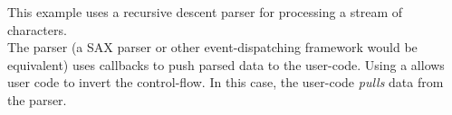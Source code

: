 \label{appendix}
This example uses a recursive descent parser for processing a stream of
characters.\\
The parser (a SAX parser or other event-dispatching framework would be
equivalent) uses callbacks to push parsed data to the user-code.
Using a \ectx allows user code to invert the control-flow. In this case, the
user-code \textit{pulls} data from the parser.
